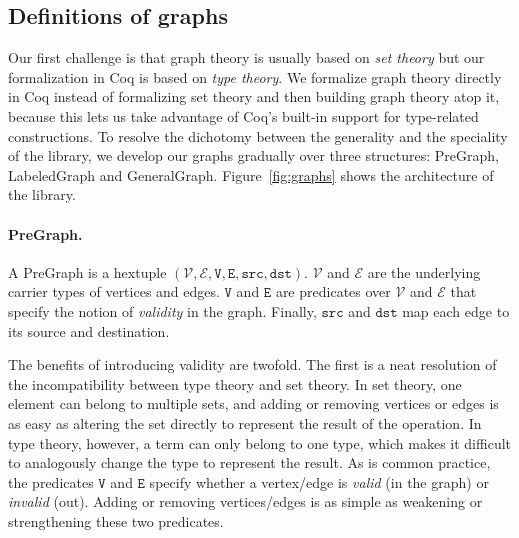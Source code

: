 \subsection{Definitions of graphs}\label{sec:mathinfra}





Our first challenge is that graph theory is usually based on
\emph{set theory} but our formalization in Coq is
based on \emph{type theory}. We formalize graph theory
directly in Coq instead of formalizing set theory and then building
graph theory atop it, because this lets us take advantage of Coq's built-in
support for type-related constructions.
To resolve the dichotomy between
the generality and the speciality of the library, we develop 
our graphs gradually over three structures: 
PreGraph, LabeledGraph and GeneralGraph.
Figure~\ref{fig:graphs} shows the
architecture of the library.


\paragraph{PreGraph.}
A PreGraph is a hextuple $(\mathcal{V}, \mathcal{E}, \mathtt{V}, \mathtt{E}, \mathtt{src}, \mathtt{dst})$.  $\mathcal{V}$ and $\mathcal{E}$ are the underlying
carrier types of vertices and edges.  $\mathtt{V}$ and $\mathtt{E}$ are predicates over
$\mathcal{V}$ and $\mathcal{E}$ that specify the notion
of \emph{validity} in the graph.  Finally, $\mathtt{src}$ and $\mathtt{dst}$ map each edge to
its source and destination.

The benefits of introducing validity are twofold. The first is a
neat resolution of the incompatibility between type theory and set theory.
In set theory, one
element can belong to multiple sets, and
adding or removing vertices or edges is as easy as altering
the set directly to represent the result of the operation.
In type theory, however, a term can only belong
to one type, which makes it difficult
to analogously change the
type to represent the result. As is common practice, the
predicates $\mathtt{V}$ and $\mathtt{E}$ specify whether a vertex/edge is \emph{valid}
(in the graph) or \emph{invalid} (out). Adding or removing vertices/edges
is as simple as weakening or strengthening these two predicates.

